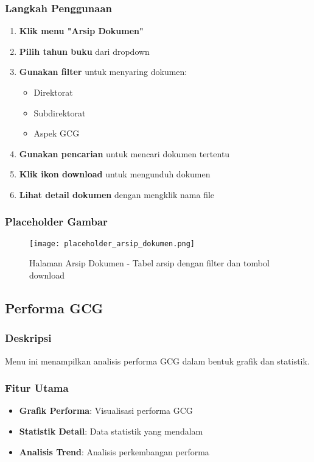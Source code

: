 \documentclass[12pt,a4paper]{article}
\begin{document}
\subsubsection{Langkah Penggunaan}
\begin{enumerate}
    \item \textbf{Klik menu "Arsip Dokumen"}
    \item \textbf{Pilih tahun buku} dari dropdown
    \item \textbf{Gunakan filter} untuk menyaring dokumen:
    \begin{itemize}
        \item Direktorat
        \item Subdirektorat
        \item Aspek GCG
    \end{itemize}
    \item \textbf{Gunakan pencarian} untuk mencari dokumen tertentu
    \item \textbf{Klik ikon download} untuk mengunduh dokumen
    \item \textbf{Lihat detail dokumen} dengan mengklik nama file
\end{enumerate}

\subsubsection{Placeholder Gambar}
\begin{figure}[H]
    \centering
    \texttt{[image: placeholder\_arsip\_dokumen.png]}
    \caption{Halaman Arsip Dokumen - Tabel arsip dengan filter dan tombol download}
    \label{fig:arsip_dokumen}
\end{figure}

\newpage

\subsection{Performa GCG}

\subsubsection{Deskripsi}
Menu ini menampilkan analisis performa GCG dalam bentuk grafik dan statistik.

\subsubsection{Fitur Utama}
\begin{itemize}
    \item \textbf{Grafik Performa}: Visualisasi performa GCG
    \item \textbf{Statistik Detail}: Data statistik yang mendalam
    \item \textbf{Analisis Trend}: Analisis perkembangan performa
\end{itemize}
\end{document}
